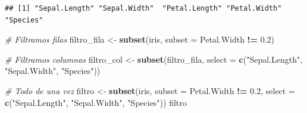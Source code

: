 \documentclass[11pt,]{book}
\newenvironment{Shaded}{\begin{snugshade}}{\end{snugshade}}
\newcommand{\CommentTok}[1]{\textcolor[rgb]{0.37,0.37,0.37}{\textit{#1}}}
\newcommand{\DataTypeTok}[1]{\textcolor[rgb]{0.27,0.27,0.27}{#1}}
\newcommand{\FloatTok}[1]{\textcolor[rgb]{0.06,0.06,0.06}{#1}}
\newcommand{\KeywordTok}[1]{\textcolor[rgb]{0.27,0.27,0.27}{\textbf{#1}}}
\newcommand{\NormalTok}[1]{#1}
\newcommand{\OperatorTok}[1]{\textcolor[rgb]{0.43,0.43,0.43}{\textbf{#1}}}
\newcommand{\StringTok}[1]{\textcolor[rgb]{0.5,0.5,0.5}{#1}}
\begin{document}
\begin{verbatim}
## [1] "Sepal.Length" "Sepal.Width"  "Petal.Length" "Petal.Width"  "Species"
\end{verbatim}

\begin{Shaded}
\begin{Highlighting}[]
\CommentTok{# Filtramos filas}
\NormalTok{filtro_fila <-}\StringTok{ }\KeywordTok{subset}\NormalTok{(iris, }\DataTypeTok{subset =}\NormalTok{ Petal.Width }\OperatorTok{!=}\StringTok{ }\FloatTok{0.2}\NormalTok{)}

\CommentTok{# Filtramos columnas}
\NormalTok{filtro_col <-}\StringTok{ }\KeywordTok{subset}\NormalTok{(filtro_fila,  }\DataTypeTok{select =} \KeywordTok{c}\NormalTok{(}\StringTok{"Sepal.Length"}\NormalTok{, }\StringTok{"Sepal.Width"}\NormalTok{, }\StringTok{"Species"}\NormalTok{))}

\CommentTok{# Todo de una vez}
\NormalTok{filtro <-}\StringTok{ }\KeywordTok{subset}\NormalTok{(iris, }\DataTypeTok{subset =}\NormalTok{ Petal.Width }\OperatorTok{!=}\StringTok{ }\FloatTok{0.2}\NormalTok{, }\DataTypeTok{select =} \KeywordTok{c}\NormalTok{(}\StringTok{"Sepal.Length"}\NormalTok{, }\StringTok{"Sepal.Width"}\NormalTok{, }\StringTok{"Species"}\NormalTok{))}
\NormalTok{filtro}
\end{Highlighting}
\end{Shaded}
\end{document}
